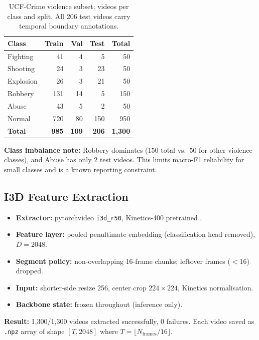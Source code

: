 \documentclass[11pt]{article}
\begin{document}
\begin{table}[h]
\centering
\small
\begin{tabular}{lrrrr}
\toprule
\textbf{Class} & \textbf{Train} & \textbf{Val} & \textbf{Test} & \textbf{Total} \\
\midrule
Fighting   &  41 &  4 &   5 &   50 \\
Shooting   &  24 &  3 &  23 &   50 \\
Explosion  &  26 &  3 &  21 &   50 \\
Robbery    & 131 & 14 &   5 &  150 \\
Abuse      &  43 &  5 &   2 &   50 \\
Normal     & 720 & 80 & 150 &  950 \\
\midrule
\textbf{Total} & \textbf{985} & \textbf{109} & \textbf{206} & \textbf{1,300} \\
\bottomrule
\end{tabular}
\caption{UCF-Crime violence subset: videos per class and split.
         All 206 test videos carry temporal boundary annotations.}
\label{tab:dataset_splits}
\end{table}

\textbf{Class imbalance note:}
Robbery dominates (150 total vs.\ 50 for other violence classes), and Abuse has
only 2 test videos.
This limits macro-F1 reliability for small classes and is a known reporting
constraint.

\subsection{I3D Feature Extraction}

\begin{itemize}
\item \textbf{Extractor:} pytorchvideo \texttt{i3d\_r50},
      Kinetics-400 pretrained \citep{paul2018w}.
\item \textbf{Feature layer:} pooled penultimate embedding
      (classification head removed), $D = 2048$.
\item \textbf{Segment policy:} non-overlapping 16-frame chunks;
      leftover frames ($< 16$) dropped.
\item \textbf{Input:} shorter-side resize 256, center crop $224\!\times\!224$,
      Kinetics normalisation.
\item \textbf{Backbone state:} frozen throughout (inference only).
\end{itemize}

\textbf{Result:} 1,300/1,300 videos extracted successfully, 0 failures.
Each video saved as \texttt{.npz} array of shape $[T, 2048]$ where
$T = \lfloor N_\mathrm{frames} / 16 \rfloor$.
\end{document}
